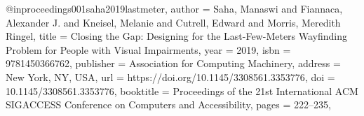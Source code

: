 @inproceedings{001saha2019lastmeter,
author = {Saha, Manaswi and Fiannaca, Alexander J. and Kneisel, Melanie and Cutrell, Edward and Morris, Meredith Ringel},
title = {Closing the Gap: Designing for the Last-Few-Meters Wayfinding Problem for People with Visual Impairments},
year = {2019},
isbn = {9781450366762},
publisher = {Association for Computing Machinery},
address = {New York, NY, USA},
url = {https://doi.org/10.1145/3308561.3353776},
doi = {10.1145/3308561.3353776},
booktitle = {Proceedings of the 21st International ACM SIGACCESS Conference on Computers and Accessibility},
pages = {222–235},
}